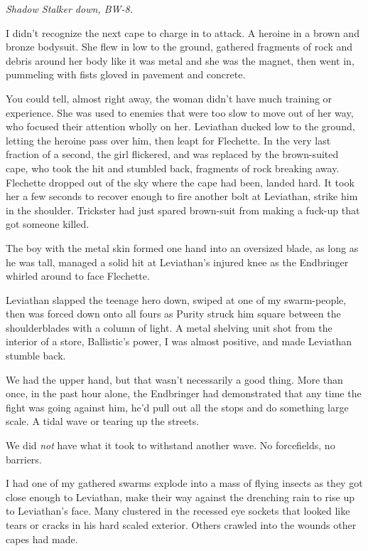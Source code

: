 \emph{Shadow Stalker down, BW-8.}



I didn't recognize the next cape to charge in to attack.  A heroine in a brown and bronze bodysuit.  She flew in low to the ground, gathered fragments of rock and debris around her body like it was metal and she was the magnet, then went in, pummeling with fists gloved in pavement and concrete.



You could tell, almost right away, the woman didn't have much training or experience.  She was used to enemies that were too slow to move out of her way, who focused their attention wholly on her.  Leviathan ducked low to the ground, letting the heroine pass over him, then leapt for Flechette.  In the very last fraction of a second, the girl flickered, and was replaced by the brown-suited cape, who took the hit and stumbled back, fragments of rock breaking away.  Flechette dropped out of the sky where the cape had been, landed hard.  It took her a few seconds to recover enough to fire another bolt at Leviathan, strike him in the shoulder.  Trickster had just spared brown-suit from making a fuck-up that got someone killed.



The boy with the metal skin formed one hand into an oversized blade, as long as he was tall, managed a solid hit at Leviathan's injured knee as the Endbringer whirled around to face Flechette.



Leviathan slapped the teenage hero down, swiped at one of my swarm-people, then was forced down onto all fours as Purity struck him square between the shoulderblades with a column of light.  A metal shelving unit shot from the interior of a store, Ballistic's power, I was almost positive, and made Leviathan stumble back.



We had the upper hand, but that wasn't necessarily a good thing.  More than once, in the past hour alone, the Endbringer had demonstrated that any time the fight was going against him, he'd pull out all the stops and do something large scale.  A tidal wave or tearing up the streets.



We did \emph{not} have what it took to withstand another wave.  No forcefields, no barriers.



I had one of my gathered swarms explode into a mass of flying insects as they got close enough to Leviathan, make their way against the drenching rain to rise up to Leviathan's face.  Many clustered in the recessed eye sockets that looked like tears or cracks in his hard scaled exterior.  Others crawled into the wounds other capes had made.



